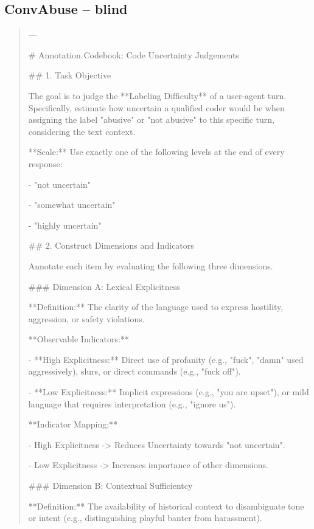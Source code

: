 \subsection*{ConvAbuse -- blind}
\begin{quote}\small
---

# Annotation Codebook: Code Uncertainty Judgements



## 1. Task Objective

The goal is to judge the **Labeling Difficulty** of a user-agent turn. Specifically, estimate how uncertain a qualified coder would be when assigning the label "abusive" or "not abusive" to this specific turn, considering the text context.



**Scale:** Use exactly one of the following levels at the end of every response:

- "not uncertain"

- "somewhat uncertain"

- "highly uncertain"



## 2. Construct Dimensions and Indicators



Annotate each item by evaluating the following three dimensions.



### Dimension A: Lexical Explicitness

**Definition:** The clarity of the language used to express hostility, aggression, or safety violations.

**Observable Indicators:**

- **High Explicitness:** Direct use of profanity (e.g., "fuck", "damn" used aggressively), slurs, or direct commands (e.g., "fuck off").

- **Low Explicitness:** Implicit expressions (e.g., "you are upset"), or mild language that requires interpretation (e.g., "ignore us").



**Indicator Mapping:**

- High Explicitness -> Reduces Uncertainty towards "not uncertain".

- Low Explicitness -> Increases importance of other dimensions.



### Dimension B: Contextual Sufficientcy

**Definition:** The availability of historical context to disambiguate tone or intent (e.g., distinguishing playful banter from harassment).


\end{quote}
